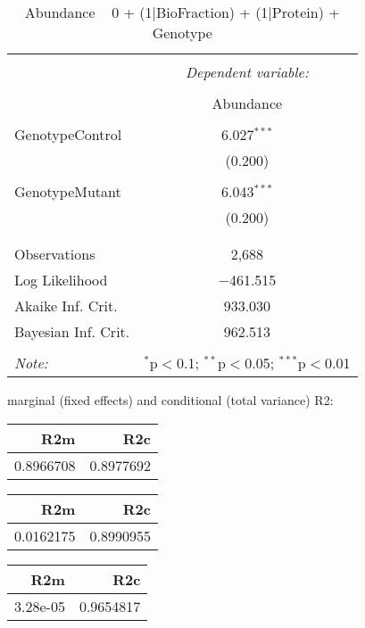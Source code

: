\documentclass[11pt]{report}
\begin{document}
\begin{table}[!htbp] \centering 
  \caption{Abundance ~ 0 + (1|BioFraction) + (1|Protein) + Genotype} 
  \label{} 
\begin{tabular}{@{\extracolsep{5pt}}lc} 
\\[-1.8ex]\hline 
\hline \\[-1.8ex] 
 & \multicolumn{1}{c}{\textit{Dependent variable:}} \\ 
\cline{2-2} 
\\[-1.8ex] & Abundance \\ 
\hline \\[-1.8ex] 
 GenotypeControl & 6.027$^{***}$ \\ 
  & (0.200) \\ 
  & \\ 
 GenotypeMutant & 6.043$^{***}$ \\ 
  & (0.200) \\ 
  & \\ 
\hline \\[-1.8ex] 
Observations & 2,688 \\ 
Log Likelihood & $-$461.515 \\ 
Akaike Inf. Crit. & 933.030 \\ 
Bayesian Inf. Crit. & 962.513 \\ 
\hline 
\hline \\[-1.8ex] 
\textit{Note:}  & \multicolumn{1}{r}{$^{*}$p$<$0.1; $^{**}$p$<$0.05; $^{***}$p$<$0.01} \\ 
\end{tabular} 
\end{table} 
marginal (fixed effects) and conditional (total variance) R2:

\begin{tabular}{r|r}
\hline
R2m & R2c\\
\hline
0.8966708 & 0.8977692\\
\hline
\end{tabular}

\begin{tabular}{r|r}
\hline
R2m & R2c\\
\hline
0.0162175 & 0.8990955\\
\hline
\end{tabular}

\begin{tabular}{r|r}
\hline
R2m & R2c\\
\hline
3.28e-05 & 0.9654817\\
\hline
\end{tabular}
\end{document}
